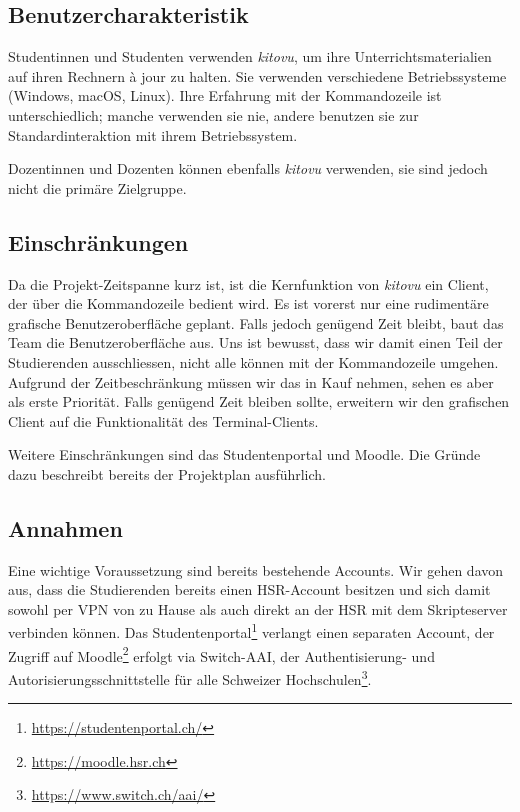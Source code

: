 \documentclass[a4paper]{article}
\begin{document}
\subsection{Benutzercharakteristik}
Studentinnen und Studenten verwenden \emph{kitovu}, um ihre Unterrichtsmaterialien auf ihren Rechnern à jour zu halten. Sie verwenden verschiedene Betriebssysteme (Windows, macOS, Linux). Ihre Erfahrung mit der Kommandozeile ist unterschiedlich; manche verwenden sie nie, andere benutzen sie zur Standardinteraktion mit ihrem Betriebssystem.

Dozentinnen und Dozenten können ebenfalls \emph{kitovu} verwenden, sie sind jedoch nicht die primäre Zielgruppe.

\subsection{Einschränkungen}
Da die Projekt-Zeitspanne kurz ist, ist die Kernfunktion von \emph{kitovu} ein Client, der über die Kommandozeile bedient wird. Es ist vorerst nur eine rudimentäre grafische Benutzeroberfläche geplant. Falls jedoch genügend Zeit bleibt, baut das Team die Benutzeroberfläche aus. Uns ist bewusst, dass wir damit einen Teil der Studierenden ausschliessen, nicht alle können mit der Kommandozeile umgehen. Aufgrund der Zeitbeschränkung müssen wir das in Kauf nehmen, sehen es aber als erste Priorität. Falls genügend Zeit bleiben sollte, erweitern wir den grafischen Client auf die Funktionalität des Terminal-Clients.

Weitere Einschränkungen sind das Studentenportal und Moodle. Die Gründe dazu beschreibt bereits der Projektplan ausführlich.


\subsection{Annahmen}
Eine wichtige Voraussetzung sind bereits bestehende Accounts. Wir gehen davon aus, dass die Studierenden bereits einen HSR-Account besitzen und sich damit sowohl per VPN von zu Hause als auch direkt an der HSR mit dem Skripteserver verbinden können. Das Studentenportal\footnote{\url{https://studentenportal.ch/}} verlangt einen separaten Account, der Zugriff auf Moodle\footnote{\url{https://moodle.hsr.ch}} erfolgt via Switch-AAI, der Authentisierung- und Autorisierungsschnittstelle für alle Schweizer Hochschulen\footnote{\url{https://www.switch.ch/aai/}}.
\end{document}
